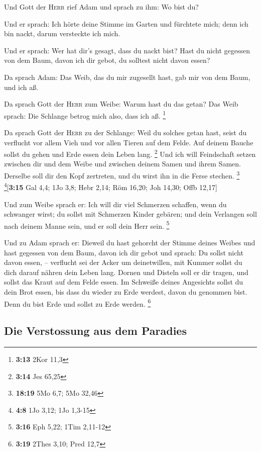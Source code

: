  Und Gott der \textsc{Herr} rief Adam und sprach zu ihm:
Wo bist du?

 Und er sprach: Ich hörte deine Stimme im Garten und
fürchtete mich; denn ich bin nackt, darum versteckte ich mich.

 Und er sprach: Wer hat dir's gesagt, dass du nackt bist?
Hast du nicht gegessen von dem Baum, davon ich dir gebot, du solltest
nicht davon essen?

 Da sprach Adam: Das Weib, das du mir zugesellt hast, gab
mir von dem Baum, und ich aß.

 Da sprach Gott der \textsc{Herr} zum Weibe: Warum hast
du das getan? Das Weib sprach: Die Schlange betrog mich also, dass ich
aß. \footnote{\textbf{3:13} 2Kor 11,3}

 Da sprach Gott der \textsc{Herr} zu der Schlange: Weil
du solches getan hast, seist du verflucht vor allem Vieh und vor allen
Tieren auf dem Felde. Auf deinem Bauche sollst du gehen und Erde essen
dein Leben lang. \footnote{\textbf{3:14} Jes 65,25}  Und
ich will Feindschaft setzen zwischen dir und dem Weibe und zwischen
deinem Samen und ihrem Samen. Derselbe soll dir den Kopf zertreten, und
du wirst ihn in die Ferse stechen. \footnote{\textbf{18:19} 5Mo 6,7; 5Mo
  32,46} \footnote{\textbf{4:8} 1Jo 3,12; 1Jo 1,3-15}{[}\textbf{3:15}
Gal 4,4; 1Jo 3,8; Hebr 2,14; Röm 16,20; Joh 14,30; Offb 12,17{]}

 Und zum Weibe sprach er: Ich will dir viel Schmerzen
schaffen, wenn du schwanger wirst; du sollst mit Schmerzen Kinder
gebären; und dein Verlangen soll nach deinem Manne sein, und er soll
dein Herr sein. \footnote{\textbf{3:16} Eph 5,22; 1Tim 2,11-12}

 Und zu Adam sprach er: Dieweil du hast gehorcht der
Stimme deines Weibes und hast gegessen von dem Baum, davon ich dir gebot
und sprach: Du sollst nicht davon essen, -- verflucht sei der Acker um
deinetwillen, mit Kummer sollst du dich darauf nähren dein Leben lang.
 Dornen und Disteln soll er dir tragen, und sollst das
Kraut auf dem Felde essen.  Im Schweiße deines Angesichts
sollst du dein Brot essen, bis dass du wieder zu Erde werdest, davon du
genommen bist. Denn du bist Erde und sollst zu Erde werden. \footnote{\textbf{3:19}
  2Thes 3,10; Pred 12,7}

\hypertarget{die-verstossung-aus-dem-paradies}{%
\subsection{Die Verstossung aus dem
Paradies}\label{die-verstossung-aus-dem-paradies}}

